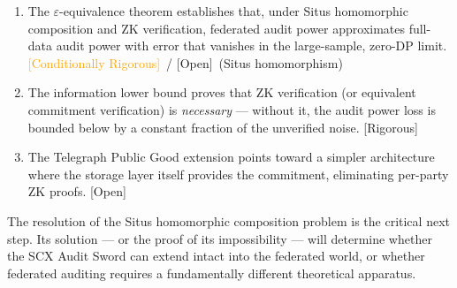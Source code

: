 \documentclass[12pt,a4paper]{article}
\newcommand{\rigorous}{\textcolor{green!50!black}{\small\textsf{[Rigorous]}}}
\newcommand{\conditionallyrigorous}{\textcolor{orange}{\small\textsf{[Conditionally Rigorous]}}}
\newcommand{\openquest}{\textcolor{red!70!black}{\small\textsf{[Open]}}}
\newcommand{\ZK}{\mathrm{ZK}}
\begin{document}
\begin{enumerate}[label=(\arabic*)]
    \item The $\varepsilon$-equivalence theorem establishes that, under Situs
          homomorphic composition and $\ZK$ verification, federated audit
          power approximates full-data audit power with error that vanishes
          in the large-sample, zero-DP limit.  \conditionallyrigorous~/
          \openquest~(Situs homomorphism)
    \item The information lower bound proves that $\ZK$ verification (or
          equivalent commitment verification) is \emph{necessary} — without
          it, the audit power loss is bounded below by a constant fraction
          of the unverified noise.  \rigorous
    \item The Telegraph Public Good extension points toward a simpler
          architecture where the storage layer itself provides the
          commitment, eliminating per-party $\ZK$ proofs.  \openquest
\end{enumerate}

The resolution of the Situs homomorphic composition problem is the critical
next step.  Its solution — or the proof of its impossibility — will determine
whether the SCX Audit Sword can extend intact into the federated world, or
whether federated auditing requires a fundamentally different theoretical
apparatus.
\end{document}
